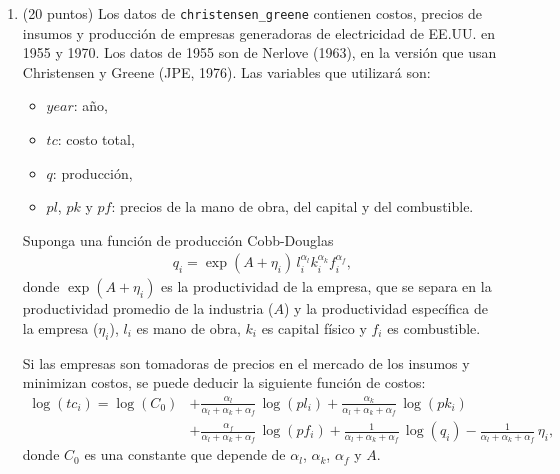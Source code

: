 \documentclass[letterpaper,11pt]{article}
\theoremstyle{plain}
\theoremstyle{definition}
\theoremstyle{remark}
\begin{document}
\begin{enumerate}
\item (20 puntos) Los datos de \texttt{christensen\_greene} contienen costos, precios de
    insumos y producci\'on de empresas generadoras de electricidad de EE.UU. en 1955 y 1970. Los
    datos de 1955 son de Nerlove (1963), en la versi\'on que usan Christensen y Greene (JPE,
    1976). Las variables que utilizar\'a son:
    \begin{itemize}
        \item $year$: a\~no,
        \item $tc$: costo total,
        \item $q$: producci\'on,
        \item $pl$, $pk$ y $pf$: precios de la mano de obra, del capital y del combustible.
    \end{itemize}
    Suponga una funci\'on de producci\'on Cobb-Douglas
    \begin{align*}
    q_i = \exp(A+\eta_i)\, l_i^{\alpha_l} k_i^{\alpha_k} f_i^{\alpha_f},
    \end{align*}
    donde $\exp(A+\eta_i)$ es la productividad de la empresa, que se separa en la productividad
    promedio de la industria ($A$) y la productividad espec\'ifica de la empresa ($\eta_i$),
    $l_i$ es mano de obra, $k_i$ es capital f\'isico y $f_i$ es combustible.

    Si las empresas son tomadoras de precios en el mercado de los insumos y minimizan costos,
    se puede deducir la siguiente funci\'on de costos:
    \begin{align*}
    \log(tc_i) = \log(C_0) &+ \frac{\alpha_l}{\alpha_l+\alpha_k+\alpha_f} \, \log( pl_i) + \frac{\alpha_k}{\alpha_l+\alpha_k+\alpha_f} \, \log(pk_i) \\
    &+ \frac{\alpha_f}{\alpha_l+\alpha_k+\alpha_f} \, \log(pf_i) + \frac{1}{\alpha_l+\alpha_k+\alpha_f} \, \log(q_i) - \frac{1}{\alpha_l+\alpha_k+\alpha_f} \, \eta_i,
    \end{align*}
    donde $C_0$ es una constante que depende de $\alpha_l$, $\alpha_k$, $\alpha_f$ y $A$.


\end{enumerate}
\end{document}
